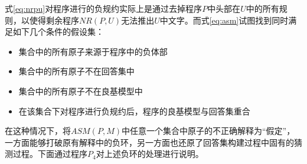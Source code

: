 式\eqref{eq:nrpu}对程序进行的负规约实际上是通过去掉程序$P$中头部在$U$中的所有规则，以使得剩余程序$NR(P, U)$无法推出$U$中文字。而式\eqref{eq:asm}试图找到同时满足如下几个条件的假设集：
\begin{itemize}[topsep=0pt]
    \setlength\itemsep{-0.3em}
    \item 集合中的所有原子来源于程序中的负体部
    \item 集合中的所有原子不在回答集中
    \item 集合中的所有原子不在良基模型中
    \item 在该集合下对程序进行负规约后，程序的良基模型与回答集重合
\end{itemize}
在这种情况下，将$ASM(P,M)$中任意一个集合中原子的不正确解释为“假定”，一方面能够打破原有解释中的负环，另一方面也还原了回答集构建过程中固有的猜测过程。下面通过程序\hyperref[prg:p_4]{$P_4$}对上述负环的处理进行说明。
